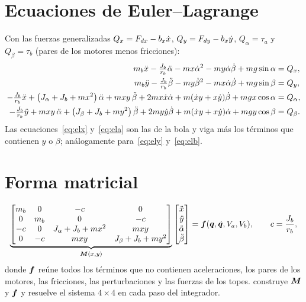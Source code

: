 \section{Ecuaciones de Euler--Lagrange}

Con las fuerzas generalizadas $Q_x=F_{dx}-b_x\dot{x}$, $Q_y=F_{dy}-b_x\dot{y}$, $Q_\alpha=\tau_a$ y $Q_\beta=\tau_b$ (pares de los motores menos fricciones):
\begin{align}
  m_b\ddot{x} - \tfrac{J_b}{r_b}\ddot{\alpha} - m x\dot{\alpha}^2 - m y\dot{\alpha}\dot{\beta} + mg\sin\alpha &= Q_x, \label{eq:elx}\\
  m_b\ddot{y} - \tfrac{J_b}{r_b}\ddot{\beta} - m y\dot{\beta}^2 - m x\dot{\alpha}\dot{\beta} + mg\sin\beta &= Q_y, \label{eq:ely}\\
  -\tfrac{J_b}{r_b}\ddot{x} + \left(J_\alpha+J_b+mx^2\right)\ddot{\alpha} + mxy\,\ddot{\beta} + 2mx\dot{x}\dot{\alpha} + m(\dot{x} y + x\dot{y})\dot{\beta} + mgx\cos\alpha &= Q_\alpha, \label{eq:ela}\\
  -\tfrac{J_b}{r_b}\ddot{y} + mxy\,\ddot{\alpha} + \left(J_\beta+J_b+my^2\right)\ddot{\beta} + 2my\dot{y}\dot{\beta} + m(\dot{x} y + x\dot{y})\dot{\alpha} + mgy\cos\beta &= Q_\beta. \label{eq:elb}
\end{align}
Las ecuaciones~\eqref{eq:elx} y~\eqref{eq:ela} son las de la bola y viga más los términos que contienen $y$ o $\beta$; análogamente para~\eqref{eq:ely} y~\eqref{eq:elb}.

\section{Forma matricial}

\begin{equation}
  \underbrace{\begin{bmatrix}
    m_b & 0 & -c & 0\\
    0 & m_b & 0 & -c\\
    -c & 0 & J_\alpha+J_b+mx^2 & mxy\\
    0 & -c & mxy & J_\beta+J_b+my^2
  \end{bmatrix}}_{\bm{M}(x,y)}
  \begin{bmatrix}\ddot{x}\\ \ddot{y}\\ \ddot{\alpha}\\ \ddot{\beta}\end{bmatrix}
  = \bm{f}(\bm{q},\dot{\bm{q}},V_a,V_b),\qquad c=\frac{J_b}{r_b},
  \label{eq:nl}
\end{equation}
donde $\bm{f}$ reúne todos los términos que no contienen aceleraciones, los pares de los motores, las fricciones, las perturbaciones y las fuerzas de los topes.  construye $\bm{M}$ y $\bm{f}$ y resuelve el sistema $4\times4$ en cada paso del integrador.

